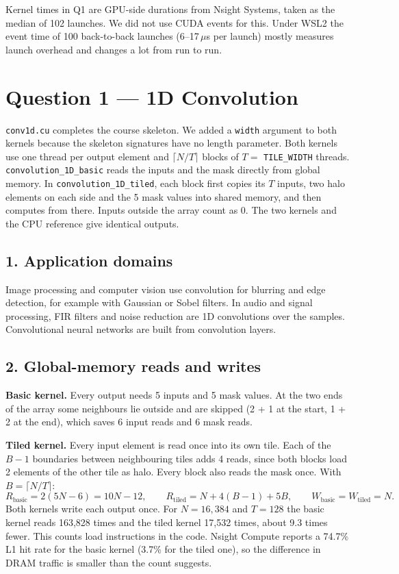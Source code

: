 \documentclass[11pt,a4paper]{article}
\newcommand{\tocentry}[1]{\addcontentsline{toc}{section}{#1}}
\begin{document}
Kernel times in Q1 are GPU-side durations from Nsight Systems, taken as the median of 102 launches. We did not use CUDA events for this. Under WSL2 the event time of 100 back-to-back launches (6--17\,\(\mu\)s per launch) mostly measures launch overhead and changes a lot from run to run.

\clearpage
\section*{Question 1 --- 1D Convolution}
\tocentry{Question 1 --- 1D Convolution}

\texttt{conv1d.cu} completes the course skeleton. We added a \texttt{width} argument to both kernels because the skeleton signatures have no length parameter. Both kernels use one thread per output element and \(\lceil N/T\rceil\) blocks of \(T=\) \texttt{TILE\_WIDTH} threads. \texttt{convolution\_1D\_basic} reads the inputs and the mask directly from global memory. In \texttt{convolution\_1D\_tiled}, each block first copies its \(T\) inputs, two halo elements on each side and the 5 mask values into shared memory, and then computes from there. Inputs outside the array count as 0. The two kernels and the CPU reference give identical outputs.

\subsection*{1. Application domains}
Image processing and computer vision use convolution for blurring and edge detection, for example with Gaussian or Sobel filters. In audio and signal processing, FIR filters and noise reduction are 1D convolutions over the samples. Convolutional neural networks are built from convolution layers.

\subsection*{2. Global-memory reads and writes}
\textbf{Basic kernel.} Every output needs 5 inputs and 5 mask values. At the two ends of the array some neighbours lie outside and are skipped (2 + 1 at the start, 1 + 2 at the end), which saves 6 input reads and 6 mask reads.

\textbf{Tiled kernel.} Every input element is read once into its own tile. Each of the \(B-1\) boundaries between neighbouring tiles adds 4 reads, since both blocks load 2 elements of the other tile as halo. Every block also reads the mask once. With \(B=\lceil N/T\rceil\):
\[
R_\text{basic}=2(5N-6)=10N-12, \qquad
R_\text{tiled}=N+4(B-1)+5B, \qquad
W_\text{basic}=W_\text{tiled}=N.
\]
Both kernels write each output once. For \(N=16{,}384\) and \(T=128\) the basic kernel reads 163,828 times and the tiled kernel 17,532 times, about 9.3 times fewer. This counts load instructions in the code. Nsight Compute reports a 74.7\% L1 hit rate for the basic kernel (3.7\% for the tiled one), so the difference in DRAM traffic is smaller than the count suggests.
\end{document}
